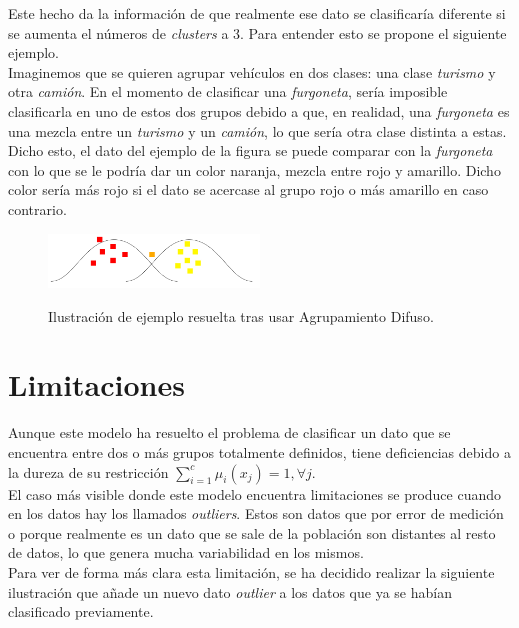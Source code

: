 \documentclass[]{report}
\begin{document}
				Este hecho da la información de que realmente ese dato se clasificaría diferente si se aumenta el números de \textit{clusters} a 3. Para entender esto se propone el siguiente ejemplo.\\
				
				Imaginemos que se quieren agrupar vehículos en dos clases: una clase \textit{turismo} y otra \textit{camión}. En el momento de clasificar una \textit{furgoneta}, sería imposible clasificarla en uno de estos dos grupos debido a que, en realidad, una \textit{furgoneta} es una mezcla entre un \textit{turismo} y un \textit{camión}, lo que sería otra clase distinta a estas.\\
				
				Dicho esto, el dato del ejemplo de la figura se puede comparar con la \textit{furgoneta} con lo que se le podría dar un color naranja, mezcla entre rojo y amarillo. Dicho color sería más rojo si el dato se acercase al grupo rojo o más amarillo en caso contrario.
				
				\begin{figure}[h]
					\centering
					\includegraphics[width=0.5\textwidth]{clustering_difuso_solucion.jpg}
					\label{clustering_difuso_solucion}
					\caption{Ilustración de ejemplo resuelta tras usar Agrupamiento Difuso.}
				\end{figure}
		
		\section{Limitaciones}
		
			Aunque este modelo ha resuelto el problema de clasificar un dato que se encuentra entre dos o más grupos totalmente definidos, tiene deficiencias debido a la dureza de su restricción $\sum_{i=1}^c\mu_i(x_j) = 1, \forall j$.\\
			
			El caso más visible donde este modelo encuentra limitaciones se produce cuando en los datos hay los llamados \textit{outliers}. Estos son datos que por error de medición o porque realmente es un dato que se sale de la población son distantes al resto de datos, lo que genera mucha variabilidad en los mismos.\\
			
			Para ver de forma más clara esta limitación, se ha decidido realizar la siguiente ilustración que añade un nuevo dato \textit{outlier} a los datos que ya se habían clasificado previamente.
			
\end{document}
